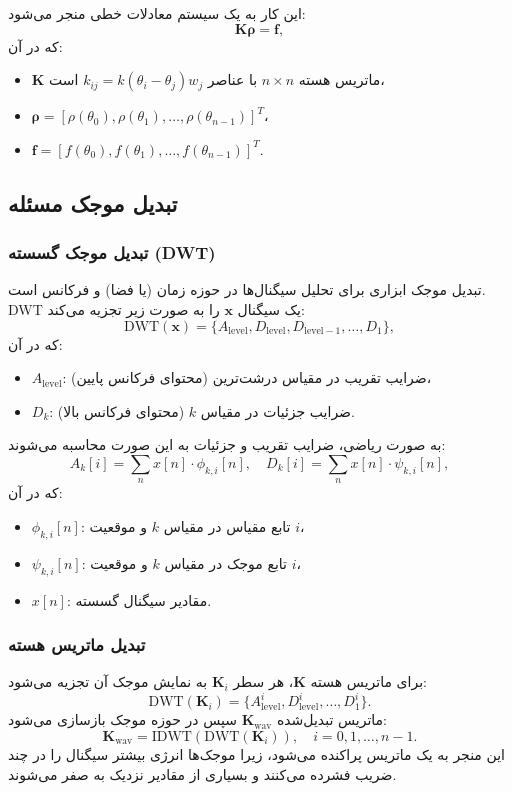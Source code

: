 \documentclass[12pt,a4paper]{article}
\begin{document}
این کار به یک سیستم معادلات خطی منجر می‌شود:
\[
    \mathbf{K} \boldsymbol{\rho} = \mathbf{f},
\]
که در آن:
\begin{itemize}
    \item \(\mathbf{K}\) ماتریس هسته \(n \times n\) با عناصر \(k_{ij} = k(\theta_i - \theta_j) w_j\) است،
    \item \(\boldsymbol{\rho} = [\rho(\theta_0), \rho(\theta_1), \dots, \rho(\theta_{n-1})]^T\)،
    \item \(\mathbf{f} = [f(\theta_0), f(\theta_1), \dots, f(\theta_{n-1})]^T\).
\end{itemize}

\subsection{تبدیل موجک مسئله}

\subsubsection{تبدیل موجک گسسته (DWT)}
تبدیل موجک ابزاری برای تحلیل سیگنال‌ها در حوزه زمان (یا فضا) و فرکانس است. DWT یک سیگنال \(\mathbf{x}\) را به صورت زیر تجزیه می‌کند:
\[
    \text{DWT}(\mathbf{x}) = \{A_\text{level}, D_\text{level}, D_{\text{level}-1}, \dots, D_1\},
\]
که در آن:
\begin{itemize}
    \item \(A_\text{level}\): ضرایب تقریب در مقیاس درشت‌ترین (محتوای فرکانس پایین)،
    \item \(D_k\): ضرایب جزئیات در مقیاس \(k\) (محتوای فرکانس بالا).
\end{itemize}

به صورت ریاضی، ضرایب تقریب و جزئیات به این صورت محاسبه می‌شوند:
\[
    A_k[i] = \sum_{n} x[n] \cdot \phi_{k,i}[n], \quad D_k[i] = \sum_{n} x[n] \cdot \psi_{k,i}[n],
\]
که در آن:
\begin{itemize}
    \item \(\phi_{k,i}[n]\): تابع مقیاس در مقیاس \(k\) و موقعیت \(i\)،
    \item \(\psi_{k,i}[n]\): تابع موجک در مقیاس \(k\) و موقعیت \(i\)،
    \item \(x[n]\): مقادیر سیگنال گسسته.
\end{itemize}

\subsubsection{تبدیل ماتریس هسته}
برای ماتریس هسته \(\mathbf{K}\)، هر سطر \(\mathbf{K}_i\) به نمایش موجک آن تجزیه می‌شود:
\[
    \text{DWT}(\mathbf{K}_i) = \{A_\text{level}^i, D_\text{level}^i, \dots, D_1^i\}.
\]
ماتریس تبدیل‌شده \(\mathbf{K}_\text{wav}\) سپس در حوزه موجک بازسازی می‌شود:
\[
    \mathbf{K}_\text{wav} = \text{IDWT}(\text{DWT}(\mathbf{K}_i)), \quad i = 0, 1, \dots, n-1.
\]
این منجر به یک ماتریس پراکنده می‌شود، زیرا موجک‌ها انرژی بیشتر سیگنال را در چند ضریب فشرده می‌کنند و بسیاری از مقادیر نزدیک به صفر می‌شوند.
\end{document}
